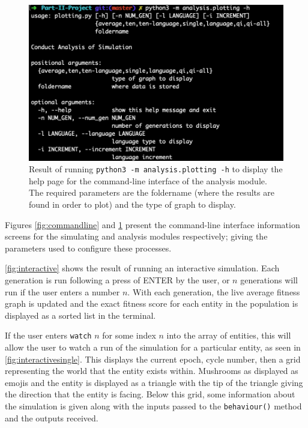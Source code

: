 \documentclass[12pt,a4paper]{report}
\begin{document}
\begin{figure}[t]
   \begin{minipage}{0.49\textwidth}
          \centering
          \captionsetup{width=.9\linewidth}
          \includegraphics[width=1.\linewidth]{figs/commandline2}
          \caption{Result of running \texttt{python3 -m analysis.plotting -h} to display the help page for the command-line interface of the analysis module. The required parameters are the foldername (where the results are found in order to plot) and the type of graph to display.}
      \label{fig:commandline2}
   \end{minipage}
\end{figure}

Figures \ref{fig:commandline} and \ref{fig:commandline2} present the command-line interface information screens for the simulating and analysis modules respectively; giving the parameters used to configure these processes.

\cref{fig:interactive} shows the result of running an interactive simulation. Each generation is run following a press of ENTER by the user, or $n$ generations will run if the user enters a number $n$. With each generation, the live average fitness graph is updated and the exact fitness score for each entity in the population is displayed as a sorted list in the terminal.

If the user enters \texttt{watch} $n$ for some index $n$ into the array of entities, this will allow the user to watch a run of the simulation for a particular entity, as seen in \cref{fig:interactivesingle}. This displays the current epoch, cycle number, then a grid representing the world that the entity exists within. Mushrooms as displayed as emojis and the entity is displayed as a triangle with the tip of the triangle giving the direction that the entity is facing. Below this grid, some information about the simulation is given along with the inputs passed to the \texttt{behaviour()} method and the outputs received.
\end{document}
